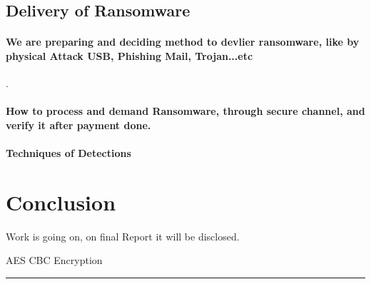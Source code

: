 \documentclass[12pt,twocolumn]{article}
\begin{document}
\subsection{Delivery of Ransomware}

\paragraph{We are preparing and deciding method to devlier ransomware, like by physical Attack USB, Phishing Mail, Trojan...etc}.

\paragraph{How to process and demand Ransomware, through secure channel, and verify it after payment done.}

\paragraph{Techniques of Detections}

\section{Conclusion}
Work is going on, on final Report it will be disclosed.

\begin{algorithm}

    \caption{AES CBC Encryption}
    \BlankLine
    
    \hrule
\end{algorithm}


\twocolumn[
    \printbibliography
]
\end{document}

